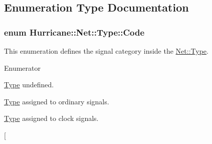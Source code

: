 \subsection{Enumeration Type Documentation}
\hypertarget{group__NetClass_ga2652e3299403e0f5979a848b267163a5}{
\subsubsection[{Code}]{\setlength{\rightskip}{0pt plus 5cm}enum {\bf Hurricane\-::\-Net\-::\-Type\-::\-Code}}}\label{group__NetClass_ga2652e3299403e0f5979a848b267163a5}
This enumeration defines the signal category inside the \hyperlink{classHurricane_1_1Net_1_1Type}{Net\-::\-Type}. \begin{Desc}
\item[Enumerator]\par
\begin{description}
\item[{\em 
\hypertarget{group__NetClass_gga2652e3299403e0f5979a848b267163a5a973ba9d650b909a277813926d7ec4f96}{U\-N\-D\-E\-F\-I\-N\-E\-D}\label{group__NetClass_gga2652e3299403e0f5979a848b267163a5a973ba9d650b909a277813926d7ec4f96}
}]\hyperlink{classHurricane_1_1Net_1_1Type}{Type} undefined. \item[{\em 
\hypertarget{group__NetClass_gga2652e3299403e0f5979a848b267163a5a8f454d4a48d8dbdd7d6341e7285b4a35}{L\-O\-G\-I\-C\-A\-L}\label{group__NetClass_gga2652e3299403e0f5979a848b267163a5a8f454d4a48d8dbdd7d6341e7285b4a35}
}]\hyperlink{classHurricane_1_1Net_1_1Type}{Type} assigned to ordinary signals. \item[{\em 
\hypertarget{group__NetClass_gga2652e3299403e0f5979a848b267163a5a94d77dd6484c8f8524a3960d42d3974b}{C\-L\-O\-C\-K}\label{group__NetClass_gga2652e3299403e0f5979a848b267163a5a94d77dd6484c8f8524a3960d42d3974b}
}]\hyperlink{classHurricane_1_1Net_1_1Type}{Type} assigned to clock signals. \item[{\em 
}
\end{description}
\end{Desc}
